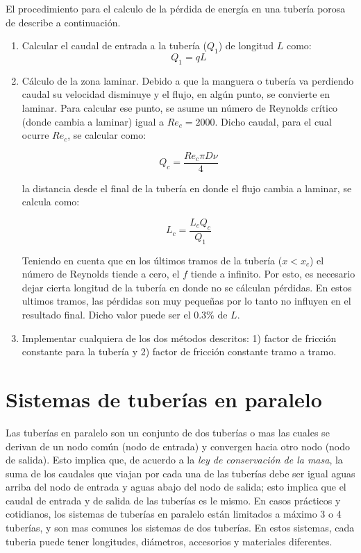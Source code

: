 \documentclass[10pt, oneside]{article}
\begin{document}
El procedimiento para el calculo de la p\'erdida de energ\'ia en una tuber\'ia porosa de describe a continuaci\'on.
\begin{enumerate}
\item Calcular el caudal de entrada a la tuber\'ia  ($Q_1$) de longitud $L$ como:
\begin{equation}
Q_1 = q L
\label{poro14}
\end{equation}

\item C\'alculo de la zona laminar. Debido a que la manguera o tuber\'ia va perdiendo caudal su velocidad disminuye y el flujo, en alg\'un punto, se convierte en laminar. Para calcular ese punto, se asume un n\'umero de Reynolds cr\'itico (donde cambia a laminar) igual a $Re_c=2000$. Dicho caudal, para el cual ocurre $Re_c$, se calcular como:

\begin{equation}
Q_c = \frac{Re_c \pi D \nu}{4}
\label{poro15}
\end{equation}

la distancia desde el final de la tuber\'ia en donde el flujo cambia a laminar, se calcula como:

\begin{equation}
L_c = \frac{L_c Q_c}{Q_1}
\label{poro16}
\end{equation}

Teniendo en cuenta que en los \'ultimos tramos de la tuber\'ia ($x < x_c$) el n\'umero de Reynolds tiende a cero,  el $f$ tiende a infinito. Por esto, es necesario dejar cierta longitud de la tuber\'ia en donde no se c\'alculan p\'erdidas. En estos ultimos tramos, las p\'erdidas son muy peque\~nas por lo tanto no influyen en el resultado final. Dicho valor puede ser el 0.3\% de $L$.

\item Implementar cualquiera de los dos m\'etodos descritos: 1) factor de fricci\'on constante para la tuber\'ia y 2) factor de fricci\'on constante tramo a tramo.

\end{enumerate}


\section{Sistemas de tuber\'ias en paralelo} 
Las tuber\'ias en paralelo son un conjunto de dos tuber\'ias o mas las cuales se derivan de un nodo com\'un (nodo de entrada) y convergen hacia otro nodo (nodo de salida). Esto implica que, de acuerdo a la \emph{ley de conservaci\'on de la masa}, la suma de los caudales que viajan por cada una de las tuber\'ias debe ser igual aguas arriba del nodo de entrada y aguas abajo del nodo de salida; esto implica que el caudal de entrada y de salida de las tuber\'ias es le mismo. En casos pr\'acticos y cotidianos, los sistemas de tuber\'ias en paralelo est\'an limitados a m\'aximo 3 o 4 tuber\'ias, y son mas comunes los sistemas de dos tuber\'ias. En estos sistemas, cada tuberia puede tener longitudes, di\'ametros, accesorios y materiales diferentes.  
\end{document}
